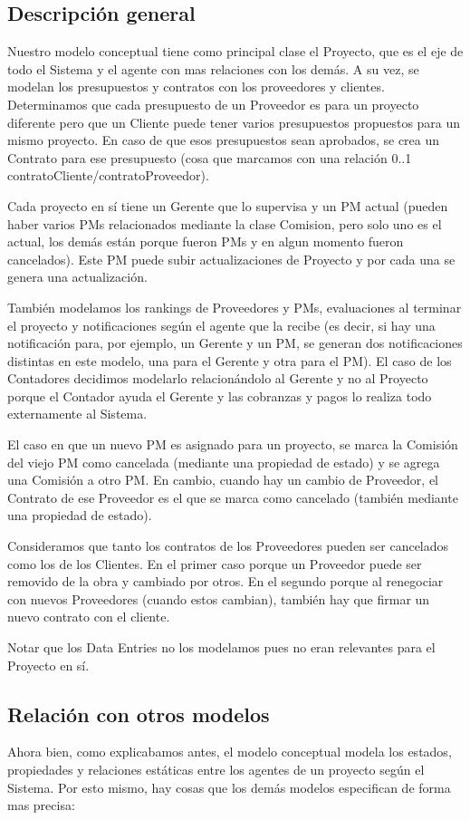 \subsection{Descripción general}
Nuestro modelo conceptual tiene como principal clase el Proyecto, que es el eje de todo el Sistema y el agente con mas relaciones con los demás. A su vez, se modelan los presupuestos y contratos con los proveedores y clientes. Determinamos que cada presupuesto de un Proveedor es para un proyecto diferente pero que un Cliente puede tener varios presupuestos propuestos para un mismo proyecto. En caso de que esos presupuestos sean aprobados, se crea un Contrato para ese presupuesto (cosa que marcamos con una relación 0..1 contratoCliente/contratoProveedor).

Cada proyecto en sí tiene un Gerente que lo supervisa y un PM actual (pueden haber varios PMs relacionados mediante la clase Comision, pero solo uno es el actual, los demás están porque fueron PMs y en algun momento fueron cancelados). Este PM puede subir actualizaciones de Proyecto y por cada una se genera una actualización.

También modelamos los rankings de Proveedores y PMs, evaluaciones al terminar el proyecto y notificaciones según el agente que la recibe (es decir, si hay una notificación para, por ejemplo, un Gerente y un PM, se generan dos notificaciones distintas en este modelo, una para el Gerente y otra para el PM).
El caso de los Contadores decidimos modelarlo relacionándolo al Gerente y no al Proyecto porque el Contador ayuda el Gerente y las cobranzas y pagos lo realiza todo externamente al Sistema.

El caso en que un nuevo PM es asignado para un proyecto, se marca la Comisión del viejo PM como cancelada (mediante una propiedad de estado) y se agrega una Comisión a otro PM. En cambio, cuando hay un cambio de Proveedor, el Contrato de ese Proveedor es el que se marca como cancelado (también mediante una propiedad de estado).

Consideramos que tanto los contratos de los Proveedores pueden ser cancelados como los de los Clientes. En el primer caso porque un Proveedor puede ser removido de la obra y cambiado por otros. En el segundo porque al renegociar con nuevos Proveedores (cuando estos cambian), también hay que firmar un nuevo contrato con el cliente.

Notar que los Data Entries no los modelamos pues no eran relevantes para el Proyecto en sí.

\subsection{Relación con otros modelos}
Ahora bien, como explicabamos antes, el modelo conceptual modela los estados, propiedades y relaciones estáticas entre los agentes de un proyecto según el Sistema. Por esto mismo, hay cosas que los demás modelos especifican de forma mas precisa:

